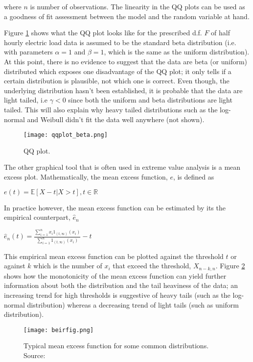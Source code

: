 \noindent where $n$ is number of observations. The linearity in the QQ plots can be used as a goodness of fit assessment between the model and the random variable at hand.

Figure \ref{fig:beta} shows what the QQ plot looks like for the prescribed d.f. $F$ of half hourly electric load data is assumed to be the standard beta distribution (i.e. with parameters $\alpha=1$ and $\beta=1$, which is the same as the uniform distribution). At this point, there is no evidence to suggest that the data are beta (or uniform) distributed  which exposes one disadvantage of the QQ plot; it only tells if a certain distribution is plausible, not which one is correct. Even though, the underlying distribution hasn't been established, it is probable that the data are light tailed, i.e $\gamma < 0$ since both the uniform and beta distributions are light tailed. This will also explain why heavy tailed distributions such as the log-normal and Weibull didn't fit the data well anywhere (not shown). 

\begin{figure}
\centering
\texttt{[image: qqplot\_beta.png]}
\caption{\label{fig:beta} QQ plot.}
\end{figure}

The other graphical tool that is often used in extreme value analysis is a mean excess plot. Mathematically, the mean excess function, $e$,  is defined as

\centerline{$e(t) = \mathbb{E}[X-t | X>t], t \in \mathbb{R}$} 
 
In practice however, the mean excess function can be estimated by its the empirical counterpart, $\hat{e}_n$ \citep[ch.~1]{beirlant}

\centerline{$\hat{e}_n(t) = \frac{\sum\limits_{i=1}^n x_i 1_{(t,\infty)}(x_i)}{\sum\limits_{i=1}^n 1_{(t,\infty)}(x_i)} - t$}

This empirical mean excess function can be plotted against the threshold $t$ or against $k$ which is the number of $x_i$ that exceed the threshold, $X_{n-k,n}$. Figure \ref{fig:beir} shows how the monotonicity of the mean excess function can yield further information about both the distribution and the tail heaviness of the data; an increasing trend for high thresholds is suggestive of heavy tails (such as the log-normal distribution) whereas a decreasing trend of light tails (such as uniform distribution).

\begin{figure}
\centering
\texttt{[image: beirfig.png]}
\caption{Typical mean excess function for some common distributions. Source: \cite{beirlant}}
\label{fig:beir} 
\end{figure}


